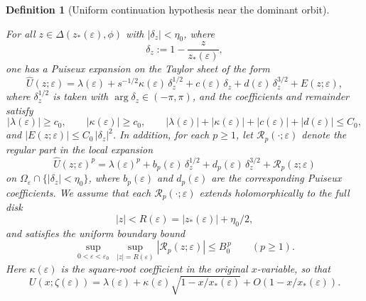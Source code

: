 \documentclass[10pt,a4paper]{amsart}
\newtheorem{definition}{Definition}
\begin{document}
\begin{definition}[Uniform continuation hypothesis near the dominant orbit]
\begin{enumerate}[label=(U\arabic*),leftmargin=2.5em]
		        For all $z\in\Delta(z_*(\varepsilon),\phi)$ with $|\delta_z|<\eta_0$, where
		      \[
			     \delta_z:=1-\frac{z}{z_*(\varepsilon)},
		      \]
		      one has a Puiseux expansion on the Taylor sheet of the form
		      \begin{equation}\label{eq:puiseux-uniform}
			      \widehat U(z;\varepsilon)
			      =
			      \lambda(\varepsilon)
			      +
				     s^{-1/2}\kappa(\varepsilon)\,\delta_z^{1/2}
			      +
				     c(\varepsilon)\,\delta_z
			      +
				    d(\varepsilon)\,\delta_z^{3/2}
			      +
			      E(z;\varepsilon),
		      \end{equation}
			    where $\delta_z^{1/2}$ is taken with $\arg\delta_z\in(-\pi,\pi)$, and the coefficients and remainder satisfy
		      \[
			      |\lambda(\varepsilon)|\ge c_0,\qquad |\kappa(\varepsilon)|\ge c_0,\qquad
			      |\lambda(\varepsilon)|+|\kappa(\varepsilon)|+|c(\varepsilon)|+|d(\varepsilon)|\le C_0,
		      \]
		      and $|E(z;\varepsilon)|\le C_0\,|\delta_z|^{2}$.
			  In addition, for each $p\ge1$, let $\mathcal R_p(\cdot;\varepsilon)$ denote the regular part in
		      the local expansion
		      \[
			      \widehat U(z;\varepsilon)^p
			      =
			      \lambda(\varepsilon)^p
			      +
			      b_p(\varepsilon)\,\delta_z^{1/2}
			      +
			      d_p(\varepsilon)\,\delta_z^{3/2}
			      +
			      \mathcal R_p(z;\varepsilon)
		      \]
		      on $\Omega_\varepsilon\cap\{|\delta_z|<\eta_0\}$, where $b_p(\varepsilon)$ and
		      $d_p(\varepsilon)$ are the corresponding Puiseux coefficients. We assume that each
		      $\mathcal R_p(\cdot;\varepsilon)$ extends holomorphically to the full disk
		      \[
			      |z|<R(\varepsilon)=|z_*(\varepsilon)|+\eta_0/2,
		      \]
		      and satisfies the uniform boundary bound
		      \[
			      \sup_{0<\varepsilon<\varepsilon_0}\ \sup_{|z|=R(\varepsilon)}
			      |\mathcal R_p(z;\varepsilon)|
			      \le B_0^{\,p}
			      \qquad (p\ge1).
		      \]
		      Here $\kappa(\varepsilon)$ is the square-root coefficient in the
		      original $x$-variable, so that
		      \[
			      U(x;\zeta(\varepsilon))
			      =
			      \lambda(\varepsilon)
			      +
			      \kappa(\varepsilon)\sqrt{1-x/x_*(\varepsilon)}
			      +
			      O\!\left(1-x/x_*(\varepsilon)\right).
		      \]
	\end{enumerate}
\end{definition}
\end{document}
